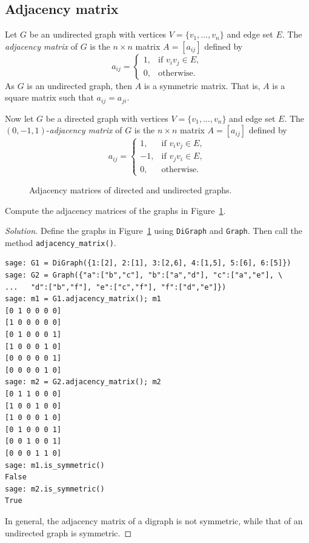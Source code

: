 
\subsection{Adjacency matrix}

Let $G$ be an undirected graph with vertices
$V = \{ v_1, \dots, v_n \}$ and edge set $E$. The
\emph{adjacency matrix} of $G$ is the $n \times n$ matrix
$A = [a_{ij}]$ defined by
\[
a_{ij}
=
\begin{cases}
1, & \text{if $v_i v_j \in E$}, \\
0, & \text{otherwise}.
\end{cases}
\]
As $G$ is an undirected graph, then $A$ is a symmetric matrix. That
is, $A$ is a square matrix such that $a_{ij} = a_{ji}$.

Now let $G$ be a directed graph with vertices
$V = \{ v_1, \dots, v_n \}$ and edge set $E$. The
$(0, -1, 1)$-\emph{adjacency matrix} of $G$ is the $n \times n$ matrix
$A = [a_{ij}]$ defined by
\[
a_{ij}
=
\begin{cases}
1,  & \text{if $v_i v_j \in E$}, \\
-1, & \text{if $v_j v_i \in E$}, \\
0,  & \text{otherwise}.
\end{cases}
\]

\begin{figure}[!htbp]
\centering

\caption{Adjacency matrices of directed and undirected graphs.}
\label{fig:introduction:adjacency_matrices}
\end{figure}

\begin{example}
Compute the adjacency matrices of the graphs in
Figure~\ref{fig:introduction:adjacency_matrices}.
\end{example}

\begin{proof}[Solution]
Define the graphs in Figure~\ref{fig:introduction:adjacency_matrices}
using \verb!DiGraph! and \verb!Graph!. Then call the method
\verb!adjacency_matrix()!.
%
\begin{lstlisting}
sage: G1 = DiGraph({1:[2], 2:[1], 3:[2,6], 4:[1,5], 5:[6], 6:[5]})
sage: G2 = Graph({"a":["b","c"], "b":["a","d"], "c":["a","e"], \
...   "d":["b","f"], "e":["c","f"], "f":["d","e"]})
sage: m1 = G1.adjacency_matrix(); m1
[0 1 0 0 0 0]
[1 0 0 0 0 0]
[0 1 0 0 0 1]
[1 0 0 0 1 0]
[0 0 0 0 0 1]
[0 0 0 0 1 0]
sage: m2 = G2.adjacency_matrix(); m2
[0 1 1 0 0 0]
[1 0 0 1 0 0]
[1 0 0 0 1 0]
[0 1 0 0 0 1]
[0 0 1 0 0 1]
[0 0 0 1 1 0]
sage: m1.is_symmetric()
False
sage: m2.is_symmetric()
True
\end{lstlisting}
%
In general, the adjacency matrix of a digraph is not symmetric, while
that of an undirected graph is symmetric.
\end{proof}

